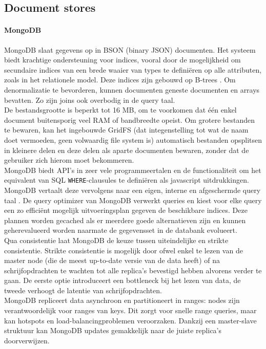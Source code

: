 \subsection{Document stores}

\paragraph{MongoDB}

MongoDB slaat gegevens op in BSON (binary JSON) documenten. Het systeem biedt krachtige ondersteuning voor indices, vooral door de mogelijkheid om secundaire indices van een brede waaier van types te defini\"eren op alle attributen, zoals in het relationele model. Deze indices zijn gebouwd op B-trees \cite{mongodb_indexes}. Om denormalizatie te bevorderen, kunnen documenten geneste documenten en arrays bevatten. Zo zijn joins ook overbodig in de query taal.\\
De bestandsgrootte is beperkt tot 16 MB, om te voorkomen dat \'e\'en enkel document buitensporig veel RAM of bandbreedte opeist. Om grotere bestanden te bewaren, kan het ingebouwde GridFS (dat integenstelling tot wat de naam doet vermoeden, geen volwaardig file system is) automatisch bestanden opsplitsen in kleinere delen en deze delen als aparte documenten bewaren, zonder dat de gebruiker zich hierom moet bekommeren.\\
MongoDB biedt API's in zeer vele programmeertalen en de functionaliteit om het equivalent van SQL \texttt{WHERE}-clausules te defini\"eren als javascript uitdrukkingen. MongoDB vertaalt deze vervolgens naar een eigen, interne en afgeschermde query taal \cite{grolinger2013data}. De query optimizer van MongoDB verwerkt queries en kiest voor elke query een zo effici\"ent mogelijk uitvoeringsplan gegeven de beschikbare indices. Deze plannen worden gecached als er meerdere goede alternatieven zijn en kunnen geherevalueerd worden naarmate de gegevensset in de databank evolueert.\\
Qua consistentie laat MongoDB de keuze tussen uiteindelijke en strikte consistentie. Strikte consistentie is mogelijk door ofwel enkel te lezen van de master node (die de meest up-to-date versie van de data heeft) of na schrijfopdrachten te wachten tot alle replica's bevestigd hebben alvorens verder te gaan. De eerste optie introduceert een bottleneck bij het lezen van data, de tweede verhoogt de latentie van schrijfopdrachten.\\
MongoDB repliceert data asynchroon en partitioneert in ranges: nodes zijn verantwoordelijk voor ranges van keys. Dit zorgt voor snelle range queries, maar kan hotspots en load-balancingproblemen veroorzaken. Dankzij een master-slave struktuur kan MongoDB updates gemakkelijk naar de juiste replica's doorverwijzen.
